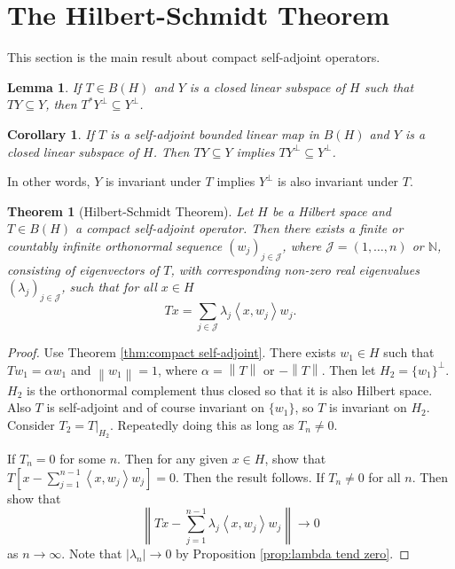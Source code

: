 \documentclass[12pt,a4paper]{report}
\numberwithin{equation}{section}
\theoremstyle{mystyle}
\newtheorem{theorem}[definition]{Theorem}
\newtheorem{lemma}[definition]{Lemma}
\newtheorem{corollary}[definition]{Corollary}
\newcommand{\N}{\mathbb{N}}
\newcommand{\norm}[1]{\left\lVert #1 \right\rVert}
\newcommand{\inner}[1]{\left\langle #1 \right\rangle}
\begin{document}
	\section{The Hilbert-Schmidt Theorem}
	This section is the main result about compact self-adjoint operators.
	\begin{lemma}
		If $T\in B(H)$ and $Y$ is a closed linear subspace of $H$ such that $TY\subseteq Y$, then $T^* Y^\perp \subseteq Y^\perp$.
	\end{lemma}
	\begin{corollary}
		If $T$ is a self-adjoint bounded linear map in $B(H)$ and $Y$ is a closed linear subspace of $H$. Then $TY\subseteq Y$ implies $TY^\perp \subseteq Y^\perp$. 
	\end{corollary}
	In other words, $Y$ is invariant under $T$ implies $Y^\perp$ is also invariant under $T$.
	\begin{theorem}[Hilbert-Schmidt Theorem]\label{thm:Hilbert-Schmidt}
		Let $H$ be a Hilbert space and $T\in B(H)$ a compact self-adjoint operator. Then there exists a finite or countably infinite orthonormal sequence $(w_j)_{j\in \mathscr{J}}$, where $\mathscr{J}=(1,\dots,n)$ or $\N$, consisting of eigenvectors of $T$, with corresponding non-zero real eigenvalues $(\lambda_j)_{j\in \mathscr{J}}$, such that for all $x\in H$
		\begin{equation}
			T x =\sum_{j\in \mathscr{J}} \lambda_j \inner{x,w_j}w_j.
		\end{equation}
	\end{theorem}
	\begin{proof}
		Use Theorem \ref{thm:compact self-adjoint}. There exists $w_1\in H$ such that $Tw_1=\alpha w_1$ and $\norm{w_1}=1$, where $\alpha=\norm{T}$ or $-\norm{T}$. Then let $H_2=\{w_1\}^\perp$. $H_2$ is the orthonormal complement thus closed so that it is also Hilbert space. Also $T$ is self-adjoint and of course invariant on $\{w_1\}$, so $T$ is invariant on $H_2$. Consider $T_2=T|_{H_2}$. Repeatedly doing this as long as $T_n\neq 0$.
		
		If $T_n=0$ for some $n$. Then for any given $x\in H$, show that $T[x-\sum_{j=1}^{n-1}\inner{x,w_j}w_j]=0$. Then the result follows. If $T_n\neq 0$ for all $n$. Then show that
		$$
		\norm{Tx-\sum_{j=1}^{n-1}\lambda_j \inner{x,w_j}w_j}\to 0
		$$
		as $n\to\infty$. Note that $|\lambda_n|\to 0$ by Proposition \ref{prop:lambda tend zero}.
	\end{proof}
	
\end{document}
